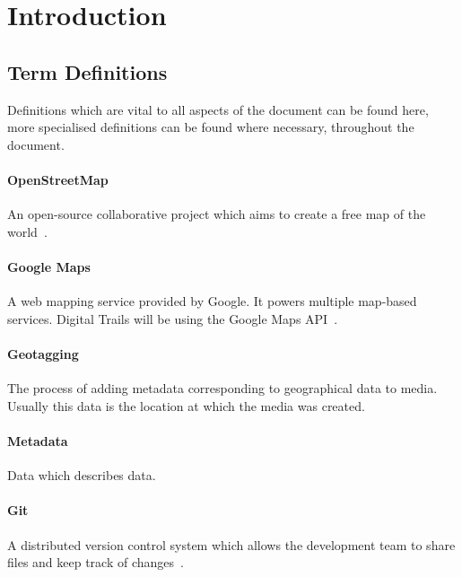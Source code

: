 \documentclass[11pt,a4paper]{report}
\begin{document}


\newpage
\setcounter{secnumdepth}{4}
\setcounter{page}{1}
\tableofcontents

\newpage
\setcounter{page}{1}
\chapter*{Introduction}
\newpage
\label{sec:introduction}
\section{Term Definitions}
\label{sec:term-definitions}
Definitions which are vital to all aspects of the document can be found here, more specialised definitions can be found where necessary, throughout the document. 

\subsubsection{OpenStreetMap}
An open-source collaborative project which aims to create a free map of the world~\cite{OSM}.

\subsubsection{Google Maps}
A web mapping service provided by Google. It powers multiple map-based services. Digital Trails will be using the Google Maps API~\cite{googleAPI}.

\subsubsection{Geotagging}
The process of adding metadata corresponding to geographical data to media. Usually this data is the location at which the media was created.

\subsubsection{Metadata}
Data which describes data.

\subsubsection{Git}
A distributed version control system which allows the development team to share files and keep track of changes~\cite{git}.
\end{document}
